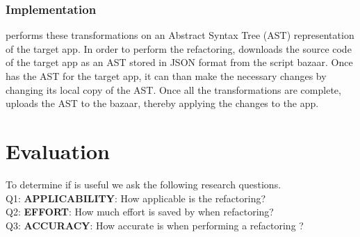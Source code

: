 \documentclass{sigplanconf}
\begin{document}
%
%
%

\subsubsection{Implementation}
\tool performs these transformations on an Abstract Syntax Tree (AST) representation of the target app.   
In order to perform the refactoring, \tool downloads the source code of the target app as an AST stored in JSON format from the \TD script bazaar.  Once \tool has the AST for the target app, it can than make the necessary changes by changing its local copy of the AST.  Once all the transformations are complete, \tool uploads the AST to the bazaar, thereby applying the changes to the app.  


\section{Evaluation}
\label{sec:evaluation}
To determine if \tool is useful we ask the following research questions.\\
Q1:  \textbf{APPLICABILITY}:  How applicable is the refactoring?\\
Q2:  \textbf{EFFORT}: How much effort is saved by \tool when refactoring?\\
Q3:  \textbf{ACCURACY}: How accurate is \tool when performing a refactoring ?\\
 
\end{document}
